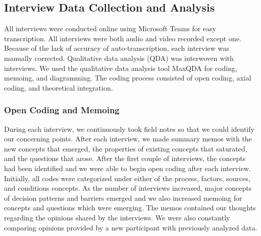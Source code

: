 \subsection{Interview Data Collection and Analysis}
All interviews were conducted online using Microsoft Teams for easy transcription. All interviews were both audio and video recorded except one. 
Because of the lack of accuracy of auto-transcription, each interview was manually corrected.  
Qualitative data analysis (QDA) was interwoven with interviews. We used the qualitative data analysis tool MaxQDA
\cite{website:maxqda} for coding, memoing, and diagramming. The coding process consisted of open coding, axial coding, and theoretical integration. 

\subsubsection{Open Coding and Memoing} During each interview, we continuously took field notes so that we could identify our concerning points. After each interview, we made summary memos with the new concepts that emerged, the properties of existing concepts that saturated, and the questions that arose. After the first couple of interviews, the concepts had been identified and we were able to begin open coding after each interview. Initially, all codes were categorized under either of the process, factors, sources, and conditions concepts. As the number of interviews increased, major concepts of decision patterns and barriers emerged and we also increased memoing for concepts and questions which were emerging. The memos contained our thoughts regarding the opinions shared by the interviews. We were also constantly comparing opinions provided by a new participant with previously analyzed data. 

